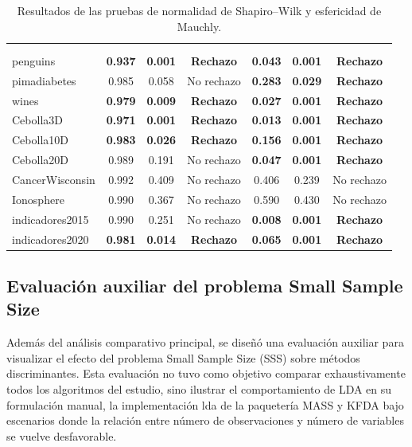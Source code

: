 \begin{table}[htbp] \centering \begin{tabular}{|C{3.2cm}|c|c|c|c|c|c|} \hline {} &  &  \\  \encabezado{} &  &  &  &  &  &  \\ \hline penguins & \textbf{0.937} & \textbf{0.001} & \textbf{Rechazo} & \textbf{0.043} & \textbf{0.001} & \textbf{Rechazo} \\ \hline pimadiabetes & 0.985 & 0.058 & No rechazo & \textbf{0.283} & \textbf{0.029} & \textbf{Rechazo} \\ \hline wines & \textbf{0.979} & \textbf{0.009} & \textbf{Rechazo} & \textbf{0.027} & \textbf{0.001} & \textbf{Rechazo} \\ \hline Cebolla3D & \textbf{0.971} & \textbf{0.001} & \textbf{Rechazo} & \textbf{0.013} & \textbf{0.001} & \textbf{Rechazo} \\ \hline Cebolla10D & \textbf{0.983} & \textbf{0.026} & \textbf{Rechazo} & \textbf{0.156} & \textbf{0.001} & \textbf{Rechazo} \\ \hline Cebolla20D & 0.989 & 0.191 & No rechazo & \textbf{0.047} & \textbf{0.001} & \textbf{Rechazo} \\ \hline CancerWisconsin & 0.992 & 0.409 & No rechazo & 0.406 & 0.239 & No rechazo \\ \hline Ionosphere & 0.990 & 0.367 & No rechazo & 0.590 & 0.430 & No rechazo \\ \hline indicadores2015 & 0.990 & 0.251 & No rechazo & \textbf{0.008} & \textbf{0.001} & \textbf{Rechazo} \\ \hline indicadores2020 & \textbf{0.981} & \textbf{0.014} & \textbf{Rechazo} & \textbf{0.065} & \textbf{0.001} & \textbf{Rechazo} \\ \hline \end{tabular} \caption{Resultados de las pruebas de normalidad de Shapiro--Wilk y esfericidad de Mauchly.} \label{tab:MMX} \end{table}

\subsection{Evaluación auxiliar del problema Small Sample Size}

Además del análisis comparativo principal, se diseñó una evaluación auxiliar para visualizar el efecto del problema Small Sample Size (SSS) sobre métodos discriminantes. Esta evaluación no tuvo como objetivo comparar exhaustivamente todos los algoritmos del estudio, sino ilustrar el comportamiento de LDA en su formulación manual, la implementación lda de la paquetería MASS y KFDA bajo escenarios donde la relación entre número de observaciones y número de variables se vuelve desfavorable.


